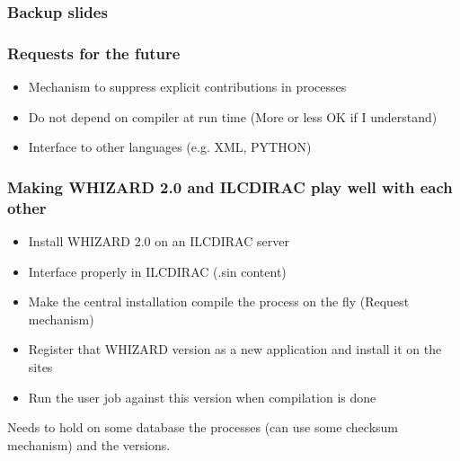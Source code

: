 \documentclass{beamer}
\newcommand{\whizard}{WHIZARD\xspace}
\begin{document}
\appendix
\begin{frame} 
\frametitle{Backup slides}
\end{frame}
\begin{frame}
\frametitle{Requests for the future}
\begin{itemize}
  \item Mechanism to suppress explicit contributions in processes
  \item Do not depend on compiler at run time (More or less OK if I understand)
  \item Interface to other languages (e.g. XML, PYTHON)
\end{itemize}
\end{frame}
\begin{frame}
\frametitle{Making \whizard2.0 and ILCDIRAC play well with each other}
\begin{itemize}
  \item Install \whizard2.0 on an ILCDIRAC server
  \item Interface properly in ILCDIRAC (.sin content)
  \item Make the central installation compile the process on the fly (Request
  mechanism)
  \item Register that \whizard version as a new application and install it on
  the sites
  \item Run the user job against this version when compilation is done
\end{itemize}
Needs to hold on some database the processes (can use some checksum mechanism)
and the versions.
\end{frame}
\end{document}
